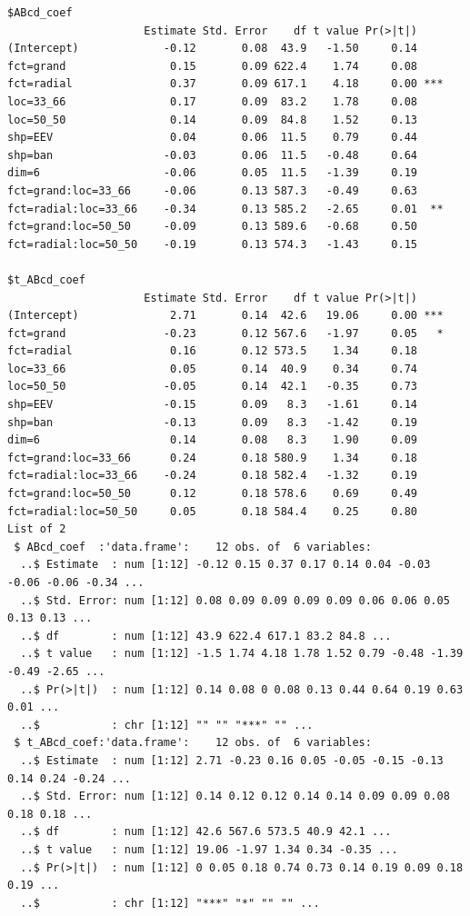 \documentclass{monashthesis}
\begin{document}
\begin{verbatim}
$ABcd_coef
                     Estimate Std. Error    df t value Pr(>|t|)    
(Intercept)             -0.12       0.08  43.9   -1.50     0.14    
fct=grand                0.15       0.09 622.4    1.74     0.08    
fct=radial               0.37       0.09 617.1    4.18     0.00 ***
loc=33_66                0.17       0.09  83.2    1.78     0.08    
loc=50_50                0.14       0.09  84.8    1.52     0.13    
shp=EEV                  0.04       0.06  11.5    0.79     0.44    
shp=ban                 -0.03       0.06  11.5   -0.48     0.64    
dim=6                   -0.06       0.05  11.5   -1.39     0.19    
fct=grand:loc=33_66     -0.06       0.13 587.3   -0.49     0.63    
fct=radial:loc=33_66    -0.34       0.13 585.2   -2.65     0.01  **
fct=grand:loc=50_50     -0.09       0.13 589.6   -0.68     0.50    
fct=radial:loc=50_50    -0.19       0.13 574.3   -1.43     0.15    

$t_ABcd_coef
                     Estimate Std. Error    df t value Pr(>|t|)    
(Intercept)              2.71       0.14  42.6   19.06     0.00 ***
fct=grand               -0.23       0.12 567.6   -1.97     0.05   *
fct=radial               0.16       0.12 573.5    1.34     0.18    
loc=33_66                0.05       0.14  40.9    0.34     0.74    
loc=50_50               -0.05       0.14  42.1   -0.35     0.73    
shp=EEV                 -0.15       0.09   8.3   -1.61     0.14    
shp=ban                 -0.13       0.09   8.3   -1.42     0.19    
dim=6                    0.14       0.08   8.3    1.90     0.09    
fct=grand:loc=33_66      0.24       0.18 580.9    1.34     0.18    
fct=radial:loc=33_66    -0.24       0.18 582.4   -1.32     0.19    
fct=grand:loc=50_50      0.12       0.18 578.6    0.69     0.49    
fct=radial:loc=50_50     0.05       0.18 584.4    0.25     0.80    
List of 2
 $ ABcd_coef  :'data.frame':    12 obs. of  6 variables:
  ..$ Estimate  : num [1:12] -0.12 0.15 0.37 0.17 0.14 0.04 -0.03 -0.06 -0.06 -0.34 ...
  ..$ Std. Error: num [1:12] 0.08 0.09 0.09 0.09 0.09 0.06 0.06 0.05 0.13 0.13 ...
  ..$ df        : num [1:12] 43.9 622.4 617.1 83.2 84.8 ...
  ..$ t value   : num [1:12] -1.5 1.74 4.18 1.78 1.52 0.79 -0.48 -1.39 -0.49 -2.65 ...
  ..$ Pr(>|t|)  : num [1:12] 0.14 0.08 0 0.08 0.13 0.44 0.64 0.19 0.63 0.01 ...
  ..$           : chr [1:12] "" "" "***" "" ...
 $ t_ABcd_coef:'data.frame':    12 obs. of  6 variables:
  ..$ Estimate  : num [1:12] 2.71 -0.23 0.16 0.05 -0.05 -0.15 -0.13 0.14 0.24 -0.24 ...
  ..$ Std. Error: num [1:12] 0.14 0.12 0.12 0.14 0.14 0.09 0.09 0.08 0.18 0.18 ...
  ..$ df        : num [1:12] 42.6 567.6 573.5 40.9 42.1 ...
  ..$ t value   : num [1:12] 19.06 -1.97 1.34 0.34 -0.35 ...
  ..$ Pr(>|t|)  : num [1:12] 0 0.05 0.18 0.74 0.73 0.14 0.19 0.09 0.18 0.19 ...
  ..$           : chr [1:12] "***" "*" "" "" ...
\end{verbatim}

\printbibliography[heading=bibintoc]
\end{document}
